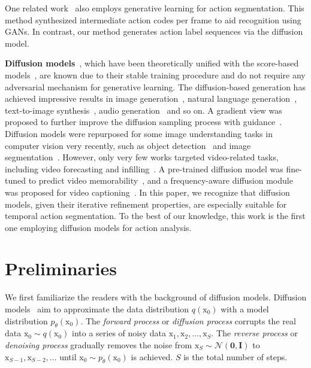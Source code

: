 \documentclass[10pt,twocolumn,letterpaper]{article}
\begin{document}
One related work~\cite{2019_WACV_Gammulle} also employs generative learning for action segmentation. 
This method synthesized intermediate action codes per frame to aid recognition using GANs. 
In contrast, our method generates action label sequences via the diffusion model.

\textbf{Diffusion models}~\cite{Therm,DiffusionSurvey,DDIM,DDPM}, which have been theoretically unified with the score-based models~\cite{score1,score2,score3}, are known due to their stable training procedure and do not require any adversarial mechanism for generative learning. 
The diffusion-based generation has achieved impressive results in image generation~\cite{BeatsGAN,LDM,2022_arXiv_Bhunia,wang2023learning}, natural language generation~\cite{yu2022latent}, text-to-image synthesis~\cite{gu2022vector,kim2021diffusionclip}, audio generation~\cite{leng2022binauralgrad,lam2022bddm} and so on.
A gradient view was proposed to further improve the diffusion sampling process with guidance~\cite{dinh2023pixelasparam}.
Diffusion models were repurposed for some image understanding tasks in computer vision very recently, such as object detection~\cite{DiffusionDet} and image segmentation~\cite{2021_ICLR_Baranchuk,SegDiff}.
However, only very few works targeted video-related tasks, including video forecasting and infilling~\cite{yang2022diffusion,hoppe2022diffusion,voleti2022masked}.
A pre-trained diffusion model was fine-tuned to predict video memorability~\cite{sweeney2022diffusing}, and a frequency-aware diffusion module was proposed for video captioning~\cite{zhong2022refined}.
In this paper, we recognize that diffusion models, given their iterative refinement properties, are especially suitable for temporal action segmentation.
To the best of our knowledge, this work is the first one employing diffusion models for action analysis.

\section{Preliminaries}

\newcommand{\mathxs}{\mathrm{x}}
\newcommand{\boldmu}{\boldsymbol{\mu}_\theta(\mathxs_{s},s)}
\newcommand{\fzpred}{f_{\theta}(\mathxs_{s},s)}

We first familiarize the readers with the background of diffusion models.
Diffusion models~\cite{DDPM, DDIM} aim to approximate the data distribution $q(\mathxs_0)$ with a model distribution $p_{\theta}
(\mathxs_0)$.
The \textit{forward process} or \textit{diffusion process} corrupts the real data $\mathxs_0 \sim q(\mathxs_0)$ into a series of noisy data $\mathxs_1, \mathxs_2, ..., \mathxs_S$. 
The \textit{reverse process} or \textit{denoising process} gradually removes the noise from $\mathxs_{S} \sim \mathcal{N}(\boldsymbol{0}, \boldsymbol{I})$ to $\mathxs_{S-1}, \mathxs_{S-2}, ...$ until $\mathxs_0 \sim p_{\theta}(\mathxs_0)$ is achieved. 
$S$ is the total number of steps.
\end{document}
